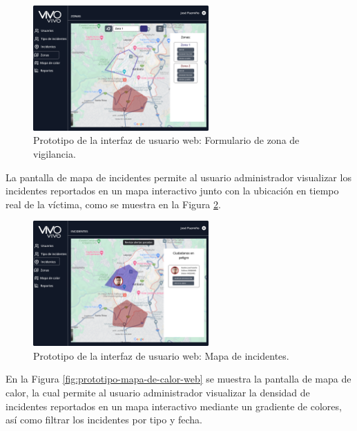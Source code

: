 \begin{figure}[H]
    \centering
    \includegraphics[width=0.6\textwidth]{chapters/III-resultados-y-discusion/resources/images/prototipo-formulario-zona-vigilancia-web.png}
    \caption{Prototipo de la interfaz de usuario web: Formulario de zona de vigilancia.}
    \label{fig:prototipo-formulario-zona-vigilancia-web}
\end{figure}

La pantalla de mapa de incidentes permite al usuario administrador visualizar los incidentes reportados en un mapa interactivo junto con la
ubicación en tiempo real de la víctima, como se muestra en la Figura \ref{fig:prototipo-mapa-incidentes-web}.

\begin{figure}[H]
    \centering
    \includegraphics[width=0.6\textwidth]{chapters/III-resultados-y-discusion/resources/images/prototipo-mapa-incidentes-web.png}
    \caption{Prototipo de la interfaz de usuario web: Mapa de incidentes.}
    \label{fig:prototipo-mapa-incidentes-web}
\end{figure}

En la Figura \ref{fig:prototipo-mapa-de-calor-web} se muestra la pantalla de mapa de calor, la cual permite al usuario administrador visualizar
la densidad de incidentes reportados en un mapa interactivo mediante un gradiente de colores, así como filtrar los incidentes por tipo y fecha.

